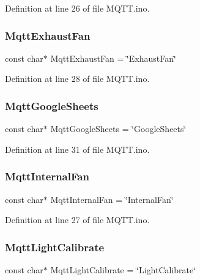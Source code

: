 Definition at line 26 of file M\+Q\+T\+T.\+ino.

\mbox{\label{_m_q_t_t_8ino_a203a63a8683d6b4d289206d50906bc20}} 
\subsubsection{\texorpdfstring{MqttExhaustFan}{MqttExhaustFan}}
{\footnotesize\ttfamily const char$\ast$ Mqtt\+Exhaust\+Fan = \char`\"{}Exhaust\+Fan\char`\"{}}



Definition at line 28 of file M\+Q\+T\+T.\+ino.

\mbox{\label{_m_q_t_t_8ino_acec4521927a00cc09dab2da8b60c2e95}} 
\subsubsection{\texorpdfstring{MqttGoogleSheets}{MqttGoogleSheets}}
{\footnotesize\ttfamily const char$\ast$ Mqtt\+Google\+Sheets = \char`\"{}Google\+Sheets\char`\"{}}



Definition at line 31 of file M\+Q\+T\+T.\+ino.

\mbox{\label{_m_q_t_t_8ino_a52679e76004f891d67309cba0dc9ec44}} 
\subsubsection{\texorpdfstring{MqttInternalFan}{MqttInternalFan}}
{\footnotesize\ttfamily const char$\ast$ Mqtt\+Internal\+Fan = \char`\"{}Internal\+Fan\char`\"{}}



Definition at line 27 of file M\+Q\+T\+T.\+ino.

\mbox{\label{_m_q_t_t_8ino_ad41848e095e9dad7c7a19f24a6e8fb35}} 
\subsubsection{\texorpdfstring{MqttLightCalibrate}{MqttLightCalibrate}}
{\footnotesize\ttfamily const char$\ast$ Mqtt\+Light\+Calibrate = \char`\"{}Light\+Calibrate\char`\"{}}



